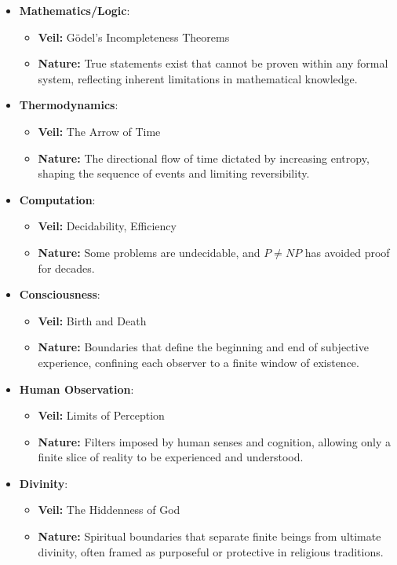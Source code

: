 \documentclass[12pt]{article}
\begin{document}
\begin{itemize}
    \item \textbf{Mathematics/Logic}:
    \begin{itemize}
        \item \textbf{Veil:} Gödel’s Incompleteness Theorems
        \item \textbf{Nature:} True statements exist that cannot be proven within any formal system, reflecting inherent limitations in mathematical knowledge.
    \end{itemize}

    \item \textbf{Thermodynamics}:
    \begin{itemize}
        \item \textbf{Veil:} The Arrow of Time
        \item \textbf{Nature:} The directional flow of time dictated by increasing entropy, shaping the sequence of events and limiting reversibility.
    \end{itemize}

    \item \textbf{Computation}:
    \begin{itemize}
        \item \textbf{Veil:} Decidability, Efficiency
        \item \textbf{Nature:} Some problems are undecidable, and $P \neq NP$ has avoided proof for decades.
    \end{itemize}

    \item \textbf{Consciousness}:
    \begin{itemize}
        \item \textbf{Veil:} Birth and Death
        \item \textbf{Nature:} Boundaries that define the beginning and end of subjective experience, confining each observer to a finite window of existence.
    \end{itemize}

    \item \textbf{Human Observation}:
    \begin{itemize}
        \item \textbf{Veil:} Limits of Perception
        \item \textbf{Nature:} Filters imposed by human senses and cognition, allowing only a finite slice of reality to be experienced and understood.
    \end{itemize}

    \item \textbf{Divinity}:
    \begin{itemize}
        \item \textbf{Veil:} The Hiddenness of God
        \item \textbf{Nature:} Spiritual boundaries that separate finite beings from ultimate divinity, often framed as purposeful or protective in religious traditions.
    \end{itemize}
\end{itemize}
\end{document}
